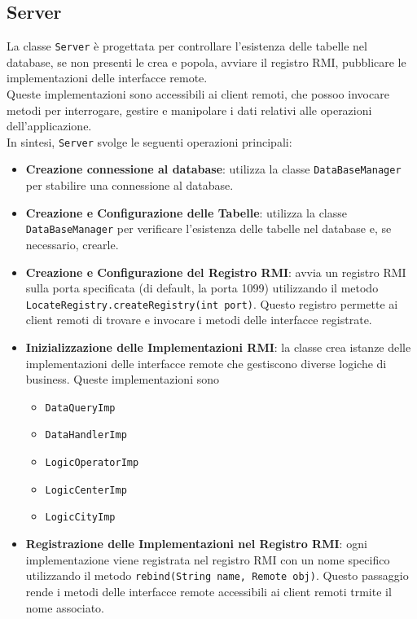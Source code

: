 \subsection{Server}
La classe \texttt{Server} è progettata per controllare l'esistenza delle tabelle nel database, se non presenti le crea e popola,
avviare il registro RMI, pubblicare le implementazioni delle interfacce remote.\\
Queste implementazioni sono accessibili ai client remoti, che possoo invocare metodi per interrogare, gestire e manipolare i dati relativi alle operazioni dell'applicazione.\\
In sintesi, \texttt{Server} svolge le seguenti operazioni principali:
\begin{itemize}
      \item \textbf{Creazione connessione al database}: utilizza la classe \texttt{DataBaseManager} per stabilire una connessione al database.
      \item \textbf{Creazione e Configurazione delle Tabelle}: utilizza la classe \texttt{DataBaseManager} per verificare l'esistenza delle tabelle nel database e, se necessario, crearle.
      \item \textbf{Creazione e Configurazione del Registro RMI}: avvia un registro RMI sulla porta specificata (di default, la porta 1099) utilizzando il metodo\\
            \texttt{LocateRegistry.createRegistry(int port)}. Questo registro permette ai client remoti di trovare e invocare i metodi delle interfacce registrate.
      \item \textbf{Inizializzazione delle Implementazioni RMI}: la classe crea istanze delle implementazioni delle interfacce remote che gestiscono diverse logiche di business.
            Queste implementazioni sono
            \begin{itemize}
                  \item \texttt{DataQueryImp}
                  \item \texttt{DataHandlerImp}
                  \item \texttt{LogicOperatorImp}
                  \item \texttt{LogicCenterImp}
                  \item \texttt{LogicCityImp}
            \end{itemize}
      \item \textbf{Registrazione delle Implementazioni nel Registro RMI}: ogni implementazione viene registrata nel registro RMI con un nome specifico utilizzando il metodo
            \texttt{rebind(String name, Remote obj)}. Questo passaggio rende i metodi delle interfacce remote accessibili ai client remoti trmite il nome associato.
\end{itemize}
